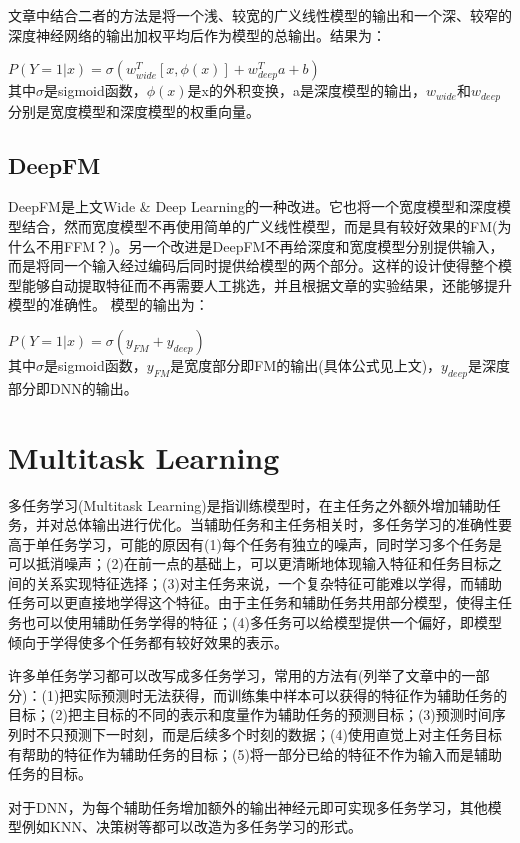 \documentclass[]{article}
\begin{document}
文章\cite{Cheng2016}中结合二者的方法是将一个浅、较宽的广义线性模型的输出和一个深、较窄的深度神经网络的输出加权平均后作为模型的总输出。结果为：

$P(Y=1|x)=\sigma(w_{wide}^T[x,\phi(x)]+w_{deep}^Ta+b)$
~\\
其中$\sigma$是sigmoid函数，$\phi(x)$是x的外积变换，a是深度模型的输出，$w_{wide}$和$w_{deep}$分别是宽度模型和深度模型的权重向量。

\subsection{DeepFM}
DeepFM\cite{Guo2017}是上文Wide \& Deep Learning的一种改进。它也将一个宽度模型和深度模型结合，然而宽度模型不再使用简单的广义线性模型，而是具有较好效果的FM(为什么不用FFM？)。另一个改进是DeepFM不再给深度和宽度模型分别提供输入，而是将同一个输入经过编码后同时提供给模型的两个部分。这样的设计使得整个模型能够自动提取特征而不再需要人工挑选，并且根据文章的实验结果，还能够提升模型的准确性。
模型的输出为：

$P(Y=1|x)=\sigma(y_{FM}+y_{deep})$
~\\
其中$\sigma$是sigmoid函数，$y_{FM}$是宽度部分即FM的输出(具体公式见上文)，$y_{deep}$是深度部分即DNN的输出。

\section{Multitask Learning}
多任务学习(Multitask Learning)\cite{Caruana1997}是指训练模型时，在主任务之外额外增加辅助任务，并对总体输出进行优化。当辅助任务和主任务相关时，多任务学习的准确性要高于单任务学习，可能的原因有(1)每个任务有独立的噪声，同时学习多个任务是可以抵消噪声；(2)在前一点的基础上，可以更清晰地体现输入特征和任务目标之间的关系实现特征选择；(3)对主任务来说，一个复杂特征可能难以学得，而辅助任务可以更直接地学得这个特征。由于主任务和辅助任务共用部分模型，使得主任务也可以使用辅助任务学得的特征；(4)多任务可以给模型提供一个偏好，即模型倾向于学得使多个任务都有较好效果的表示。

许多单任务学习都可以改写成多任务学习，常用的方法有(列举了文章中的一部分)：(1)把实际预测时无法获得，而训练集中样本可以获得的特征作为辅助任务的目标；(2)把主目标的不同的表示和度量作为辅助任务的预测目标；(3)预测时间序列时不只预测下一时刻，而是后续多个时刻的数据；(4)使用直觉上对主任务目标有帮助的特征作为辅助任务的目标；(5)将一部分已给的特征不作为输入而是辅助任务的目标。

对于DNN，为每个辅助任务增加额外的输出神经元即可实现多任务学习，其他模型例如KNN、决策树等都可以改造为多任务学习的形式。
\end{document}
